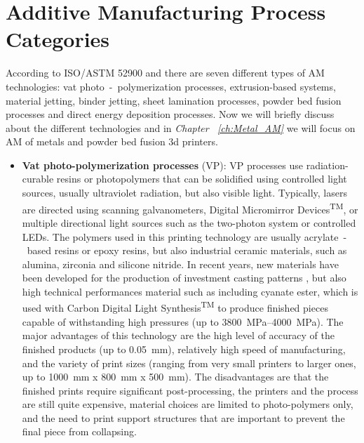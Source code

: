 
\section{Additive Manufacturing Process Categories} 
\label{sec:AMproc}
According to ISO/ASTM 52900 \cite{international_standard_organization_isoastm_2015} and \citeauthor{gibson_additive_2015} there are seven different types of AM technologies: vat photo~-~polymerization processes, extrusion-based systems, material jetting, binder jetting, sheet lamination processes, powder bed fusion processes and direct energy deposition processes. Now we will briefly discuss about the different technologies and in \textit{Chapter~ \ref{ch:Metal_AM}} we will focus on AM of metals and powder bed fusion 3d printers.
\begin{itemize}
    \item \textbf{Vat photo-polymerization processes} (VP): VP processes use radiation-curable resins or photopolymers that can be solidified using controlled light sources, usually ultraviolet radiation, but also visible light. Typically, lasers are directed using scanning galvanometers, Digital Micromirror Devices\textsuperscript{TM}, or multiple directional light sources such as the two-photon system or controlled LEDs. The polymers used in this printing technology are usually acrylate~-~based resins or epoxy resins, but also industrial ceramic materials, such as alumina, zirconia and silicone nitride. In recent years, new materials have been developed for the production of investment casting patterns \cite{3d_systems_investment_nodate}, but also high technical performances material such as including cyanate ester, which is used with Carbon Digital Light Synthesis\textsuperscript{TM} to produce finished pieces capable of withstanding high pressures (up to \SIrange[range-phrase = --]{3800}{4000}{\mega\pascal})\cite{carbon_what_nodate}. The major advantages of this technology are the high level of accuracy of the finished products (up to \SI{0.05}{\milli\metre}), relatively high speed of manufacturing, and the variety of print sizes (ranging from very small printers to larger ones, up to \SI{1000}{\milli\metre} x \SI{800}{\milli\metre} x \SI{500}{\milli\metre}). The disadvantages are that the finished prints require significant post-processing, the printers and the process are still quite expensive, material choices are limited to photo-polymers only, and the need to print support structures that are important to prevent the final piece from collapsing.

\end{itemize}
